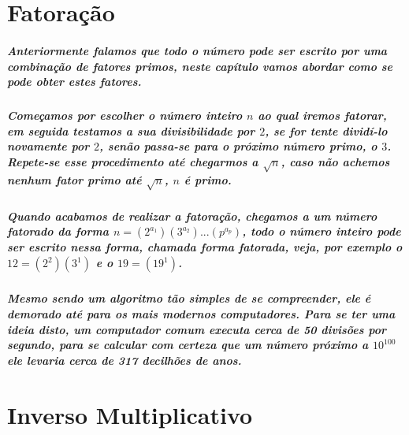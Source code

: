 \section{Fatora\c{c}\~{a}o}

\subparagraph{
Anteriormente falamos que todo o n\'umero pode ser escrito por uma combina\c{c}\~ao de fatores primos, neste cap\'itulo vamos abordar como se pode obter estes fatores.
}
\subparagraph{
Come\c{c}amos por escolher o n\'umero inteiro $n$ ao qual iremos fatorar, em seguida testamos a sua divisibilidade por $2$, se for tente divid\'i-lo novamente por $2$, sen\~ao passa-se para o pr\'oximo n\'umero primo, o $3$. Repete-se esse procedimento at\'e chegarmos a $\sqrt{n}$, caso n\~ao achemos nenhum fator primo at\'e $\sqrt{n}$, $n$ \'e primo.
}
\subparagraph{
Quando acabamos de realizar a fatora\c{c}\~ao, chegamos a um n\'umero fatorado da forma $n = (2^{a_{1}})(3^{a_{2}}) ... (p^{a_{p}})$, todo o n\'umero inteiro pode ser escrito nessa forma, chamada forma fatorada, veja, por exemplo o $12 = (2^2)(3^1)$ e o $19 = (19^1)$. 
}
\subparagraph{
Mesmo sendo um algoritmo t\~ao simples de se compreender, ele \'e demorado at\'e para os mais modernos computadores. Para se ter uma ideia disto, um computador comum executa cerca de 50 divis\~oes por segundo, para se calcular com certeza que um n\'umero pr\'oximo a $10^{100}$ ele levaria cerca de 317 decilh\~oes de anos.
}

\section{Inverso Multiplicativo}

